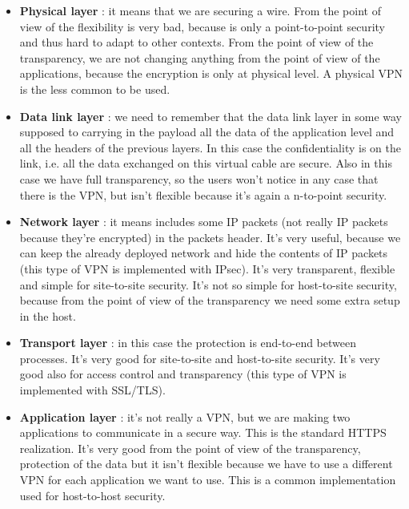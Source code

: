 \documentclass[11pt]{article}
\begin{document}
\begin{itemize}
\item \textbf{Physical layer} : it means that we are securing a wire. From the point of view of the flexibility is very bad, because is only a point-to-point security and thus hard to adapt to other contexts. From the point of view of the transparency, we are not changing anything from the point of view of the applications, because the encryption is only at physical level. A physical VPN is the less common to be used.
\item \textbf{Data link layer} : we need to remember that the data link layer in some way supposed to carrying in the payload all the data of the application level and all the headers of the previous layers. In this case the confidentiality is on the link, i.e. all the data exchanged on this virtual cable are secure. Also in this case we have full transparency, so the users won't notice in any case that there is the VPN, but isn't flexible because it's again a n-to-point security.
\item \textbf{Network layer} : it means includes some IP packets (not really IP packets because they're encrypted) in the packets header. It's very useful, because we can keep the already deployed network and hide the contents of IP packets (this type of VPN is implemented with IPsec). It's very transparent, flexible and simple for site-to-site security. It's not so simple for host-to-site security, because from the point of view of the transparency we need some extra setup in the host.
\item \textbf{Transport layer} : in this case the protection is end-to-end between processes. It's very good for site-to-site and host-to-site security. It's very good also for access control and transparency (this type of VPN is implemented with SSL/TLS).
\item \textbf{Application layer} : it's not really a VPN, but we are making two applications to communicate in a secure way. This is the standard HTTPS realization. It's very good from the point of view of the transparency, protection of the data but it isn't flexible because we have to use a different VPN for each application we want to use. This is a common implementation used for host-to-host security.
\end{itemize}
\end{document}
